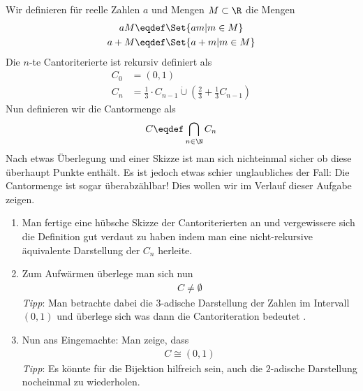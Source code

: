 \begin{exercise}
  Wir definieren für reelle Zahlen $a$ und Mengen $M\subset \R$ die Mengen
  \begin{equation*}
    \begin{split}
      aM  & \eqdef \Set{am | m \in M} \\
      a+M & \eqdef \Set{a + m | m \in M}
    \end{split}
  \end{equation*}
  Die $n$-te Cantoriterierte ist rekursiv definiert als
  \begin{equation*}
    \begin{split}
      C_0 &= (0,1)\\
      C_n &= \frac{1}{3} \cdot C_{n-1} \dot\cup \left( \frac{2}{3} + \frac{1}{3} C_{n-1} \right)
    \end{split}
  \end{equation*}
  Nun definieren wir die Cantormenge als
  \begin{equation*}
    \begin{split}
      C \eqdef \bigcap_{n\in \N} C_n
    \end{split}
  \end{equation*}
  Nach etwas Überlegung und einer Skizze ist man sich nichteinmal sicher ob
  diese überhaupt Punkte enthält. Es ist jedoch etwas schier unglaubliches der
  Fall: Die Cantormenge ist sogar überabzählbar! Dies wollen wir im Verlauf
  dieser Aufgabe zeigen.
  \begin{enumerate}[label=(\alph*)]
  \item Man fertige eine hübsche Skizze der Cantoriterierten an und vergewissere
    sich die Definition gut verdaut zu haben indem man eine nicht-rekursive
    äquivalente Darstellung der $C_n$ herleite.
  \item Zum Aufwärmen überlege man sich nun
    \begin{equation*}
      \begin{split}
        C \neq \emptyset
      \end{split}
    \end{equation*}
    \emph{Tipp}: Man betrachte dabei die $3$-adische Darstellung der Zahlen im
    Intervall $(0,1)$ und überlege sich was dann die Cantoriteration bedeutet .

  \item Nun ans Eingemachte: Man zeige, dass
    \begin{equation*}
      \begin{split}
        C \cong (0,1)
      \end{split}
    \end{equation*}
    \emph{Tipp}: Es könnte für die Bijektion hilfreich sein, auch die
    $2$-adische Darstellung nocheinmal zu wiederholen.
  \end{enumerate}
\end{exercise}
